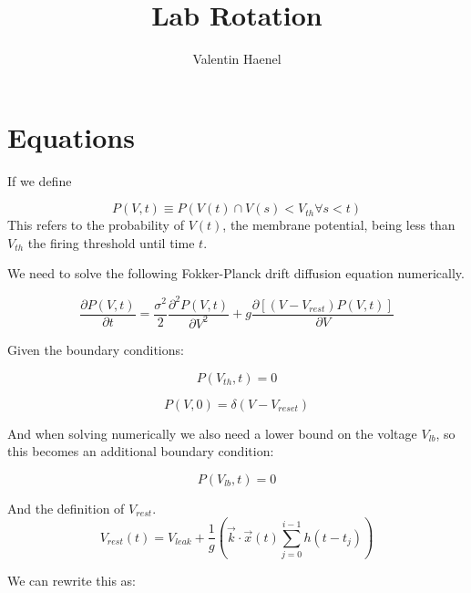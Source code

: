 \documentclass[10pt]{article}
\title{Lab Rotation}
\author{Valentin Haenel}
\begin{document}
 

\maketitle


\section{Equations}


If we define

\begin{equation}
    P(V,t) \equiv P(V(t) \cap  V(s) < V_{th} \forall s < t)
\end{equation}
This refers to the probability of $V(t)$, the membrane potential,
being less than $V_{th}$ the firing threshold until time $t$.  


We need to solve the following Fokker-Planck drift diffusion equation
numerically.

\begin{equation}
    \frac{\partial P(V,t)}{\partial t} =
    \frac{\sigma^2}{2} \frac{\partial^2 P(V,t) } {\partial V^2} +
    g\frac{\partial[(V-V_{rest})P(V,t)]}{\partial V}
\end{equation}

Given the boundary conditions:
 
\begin{equation}
    P(V_{th},t) = 0
\end{equation}

\begin{equation}
    P(V,0) = \delta(V-V_{reset})
\end{equation}

And when solving numerically we also need a lower bound on the
voltage $V_{lb}$, so this becomes an additional boundary condition:

\begin{equation}
    P(V_{lb},t) = 0 
\end{equation}


And the definition of $V_{rest}$.
\begin{equation}
    V_{rest}(t) = V_{leak} + \frac{1}{g}(\vec{k} \cdot \vec{x}(t)
    \sum_{j=0}^{i-1}h(t-t_j))
\end{equation}


We can rewrite this as:
\end{document}
